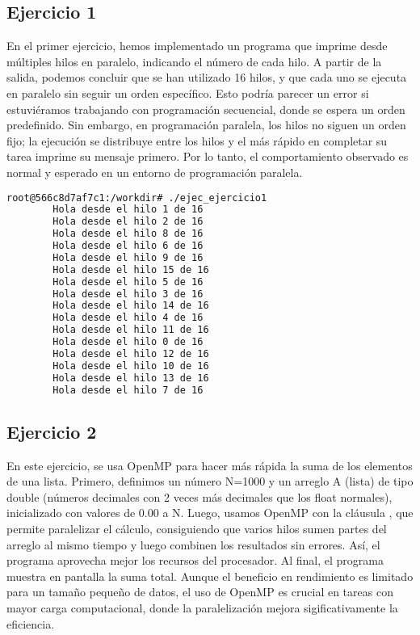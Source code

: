 \documentclass{article}
\begin{document}
	\subsection{Ejercicio 1}
	En el primer ejercicio, hemos implementado un programa que imprime  desde múltiples hilos en paralelo, indicando el número de cada hilo. A partir de la salida, podemos concluir que se han utilizado 16 hilos, y que cada uno se ejecuta en paralelo sin seguir un orden específico. Esto podría parecer un error si estuviéramos trabajando con programación secuencial, donde se espera un orden predefinido. Sin embargo, en programación paralela, los hilos no siguen un orden fijo; la ejecución se distribuye entre los hilos y el más rápido en completar su tarea imprime su mensaje primero. Por lo tanto, el comportamiento observado es normal y esperado en un entorno de programación paralela.
	
	\begin{lstlisting}[style=consola, language=bash, caption={Salida de la ejecución del Ejercicio 1.}]
		root@566c8d7af7c1:/workdir# ./ejec_ejercicio1
		Hola desde el hilo 1 de 16
		Hola desde el hilo 2 de 16
		Hola desde el hilo 8 de 16
		Hola desde el hilo 6 de 16
		Hola desde el hilo 9 de 16
		Hola desde el hilo 15 de 16
		Hola desde el hilo 5 de 16
		Hola desde el hilo 3 de 16
		Hola desde el hilo 14 de 16
		Hola desde el hilo 4 de 16
		Hola desde el hilo 11 de 16
		Hola desde el hilo 0 de 16
		Hola desde el hilo 12 de 16
		Hola desde el hilo 10 de 16
		Hola desde el hilo 13 de 16
		Hola desde el hilo 7 de 16	\end{lstlisting}
		
	
	\newpage
	\subsection{Ejercicio 2}
	En este ejercicio, se usa OpenMP para hacer más rápida la suma de los elementos de una lista. Primero, definimos un número N=1000 y un arreglo A (lista) de tipo double (números decimales con 2 veces más decimales que los float normales), inicializado con valores de 0.00 a N.
	\newline\newline
	\noindent Luego, usamos OpenMP con la cláusula , que permite paralelizar el cálculo, consiguiendo que varios hilos sumen partes del arreglo al mismo tiempo y luego combinen los resultados sin errores. Así, el programa aprovecha mejor los recursos del procesador.
	\newline\newline
	\noindent Al final, el programa muestra en pantalla la suma total. Aunque el beneficio en rendimiento es limitado para un tamaño pequeño de datos, el uso de OpenMP es crucial en tareas con mayor carga computacional, donde la paralelización mejora sigificativamente la eficiencia.
	
\end{document}

